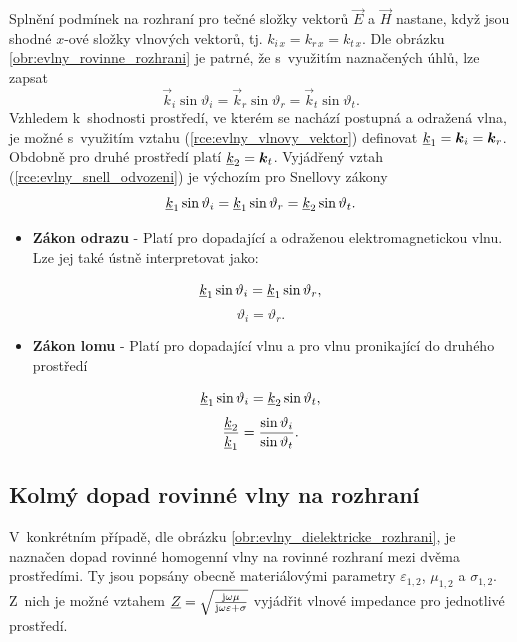 Splnění podmínek na rozhraní pro tečné složky vektorů $\vec E$ a $\vec H$ nastane, když jsou shodné $x$-ové složky vlnových vektorů, tj. $k_{i\,x} = k_{r\,x} = k_{t\,x}$. Dle obrázku \ref{obr:evlny_rovinne_rozhrani} je patrné, že s~využitím naznačených úhlů, lze zapsat
\begin{displaymath}
	\vec k_{i}\sin\vartheta_{i} = \vec k_{r}\sin\vartheta_{r} = \vec k_{t}\sin\vartheta_{t}.
\end{displaymath}
Vzhledem k~shodnosti prostředí, ve kterém se nachází postupná a odražená vlna, je možné s~využitím vztahu (\ref{rce:evlny_vlnovy_vektor}) definovat ${\underline{k}}_{1} = \mbox{\boldmath$k$}_{i} = \mbox{\boldmath$k$}_{r}$. Obdobně pro druhé prostředí platí ${\underline{k}}_{2} = \mbox{\boldmath$k$}_{t}$. Vyjádřený vztah (\ref{rce:evlny_snell_odvozeni}) je výchozím pro Snellovy zákony
\begin{equation}
	{\underline{k}}_{1}\sin\vartheta_{i} = {\underline{k}}_{1}\sin\vartheta_{r} = {\underline{k}}_{2}\sin\vartheta_{t}.
	\label{rce:evlny_snell_odvozeni}
\end{equation}
\begin{itemize}
\item {\bf Zákon odrazu} - Platí pro dopadající a odraženou elektromagnetickou vlnu. Lze jej také ústně interpretovat jako: 
\end{itemize}
\begin{displaymath}
	{\underline{k}}_{1}\sin\vartheta_{i} = {\underline{k}}_{1}\sin\vartheta_{r},
\end{displaymath}
\begin{equation}
	\vartheta_{i} = \vartheta_{r}.
	\label{rce:evlny_zakon_odrazu}
\end{equation}
\begin{itemize}
\item {\bf Zákon lomu} - Platí pro dopadající vlnu a pro vlnu pronikající do druhého prostředí
\end{itemize}
\begin{displaymath}
	{\underline{k}}_{1}\sin\vartheta_{i} = {\underline{k}}_{2}\sin\vartheta_{t},
\end{displaymath}
\begin{equation}
	\frac{{\underline{k}}_{2}}{{\underline{k}}_{1}} = \frac{\sin\vartheta_{i}}{\sin\vartheta_{t}}.
	\label{rce:evlny_zakon_lomu}
\end{equation}

\subsection{Kolmý dopad rovinné vlny na rozhraní} \label{subsec:kolmy_dopad}
V~konkrétním případě, dle obrázku \ref{obr:evlny_dielektricke_rozhrani}, je naznačen dopad rovinné homogenní vlny na rovinné rozhraní mezi dvěma prostředími. Ty jsou popsány obecně materiálovými parametry $\varepsilon_{1,2}$, $\mu_{1,2}$ a $\sigma_{1,2}$. Z~nich je možné vztahem ${\underline{Z}}=\sqrt{\frac{\mathrm{j}\omega\mu}{\mathrm{j}\omega\varepsilon + \sigma}}$ vyjádřit vlnové impedance pro jednotlivé prostředí.

